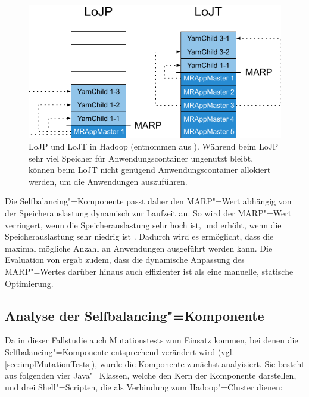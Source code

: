 \begin{figure}[h]
    \includegraphics{./images/marpValue.pdf}
    \caption[LoJP und LoJT in Hadoop]
    {LoJP und LoJT in Hadoop (entnommen aus \cite{zhang2016}).
    Während beim LoJP sehr viel Speicher für Anwendungscontainer ungenutzt bleibt, können beim LoJT nicht genügend Anwendungscontainer allokiert werden, um die Anwendungen auszuführen.}
    \label{fig:marpValue}
\end{figure}

Die Selfbalancing"=Komponente passt daher den \ac{MARP}"=Wert abhängig von der Speicherauslastung dynamisch zur Laufzeit an.
So wird der \ac{MARP}"=Wert verringert, wenn die Speicherauslastung sehr hoch ist, und erhöht, wenn die Speicherauslastung sehr niedrig ist \cite{zhang2016}.
Dadurch wird es ermöglicht, dass die maximal mögliche Anzahl an Anwendungen ausgeführt werden kann.
Die Evaluation von \citeauthor{zhang2016} ergab zudem, dass die dynamische Anpassung des \ac{MARP}"=Wertes darüber hinaus auch effizienter ist als eine manuelle, statische Optimierung.

\subsection{Analyse der Selfbalancing"=Komponente}
\label{sec:selfbalancingAnalysis}

Da in dieser Fallstudie auch Mutationstests zum Einsatz kommen, bei denen die Selfbalancing"=Komponente entsprechend verändert wird (vgl. \autoref{sec:implMutationTests}), wurde die Komponente zunächst analyisiert.
Sie besteht aus folgenden vier Java"=Klassen, welche den Kern der Komponente darstellen, und drei Shell"=Scripten, die als Verbindung zum Hadoop"=Cluster dienen:

